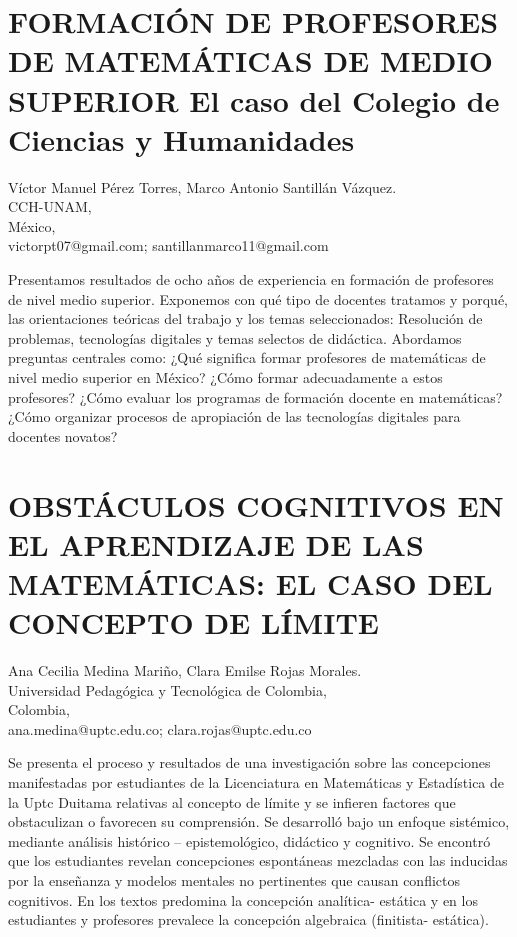 \section{FORMACIÓN DE PROFESORES DE MATEMÁTICAS DE MEDIO SUPERIOR El caso
del Colegio de Ciencias y Humanidades}

\begin{datos}
Víctor Manuel Pérez Torres, Marco Antonio Santillán Vázquez.\\
CCH-UNAM,\\
\hfill México, \\
\hfill victorpt07@gmail.com; santillanmarco11@gmail.com
\end{datos}

Presentamos resultados de ocho años de experiencia en formación de
profesores de nivel medio superior. Exponemos con qué tipo de docentes
tratamos y porqué, las orientaciones teóricas del trabajo y los temas
seleccionados: Resolución de problemas, tecnologías digitales y temas
selectos de didáctica. Abordamos preguntas centrales como: ¿Qué significa
formar profesores de matemáticas de nivel medio superior en México?
¿Cómo formar adecuadamente a estos profesores? ¿Cómo evaluar los programas
de formación docente en matemáticas? ¿Cómo organizar procesos de apropiación
de las tecnologías digitales para docentes novatos?


\section{OBSTÁCULOS COGNITIVOS EN EL APRENDIZAJE DE LAS MATEMÁTICAS: EL CASO
DEL CONCEPTO DE LÍMITE}

\begin{datos}
Ana Cecilia Medina Mariño, Clara Emilse Rojas Morales.\\
Universidad Pedagógica y Tecnológica de Colombia,\\
\hfill Colombia, \\
\hfill ana.medina@uptc.edu.co; clara.rojas@uptc.edu.co
\end{datos}

Se presenta el proceso y resultados de una investigación sobre las
concepciones manifestadas por estudiantes de la Licenciatura en Matemáticas
y Estadística de la Uptc Duitama relativas al concepto de límite y
se infieren factores que obstaculizan o favorecen su comprensión.
Se desarrolló bajo un enfoque sistémico, mediante análisis histórico
– epistemológico, didáctico y cognitivo. Se encontró que los estudiantes
revelan concepciones espontáneas mezcladas con las inducidas por la
enseñanza y modelos mentales no pertinentes que causan conflictos
cognitivos. En los textos predomina la concepción analítica- estática
y en los estudiantes y profesores prevalece la concepción algebraica
(finitista- estática). 


